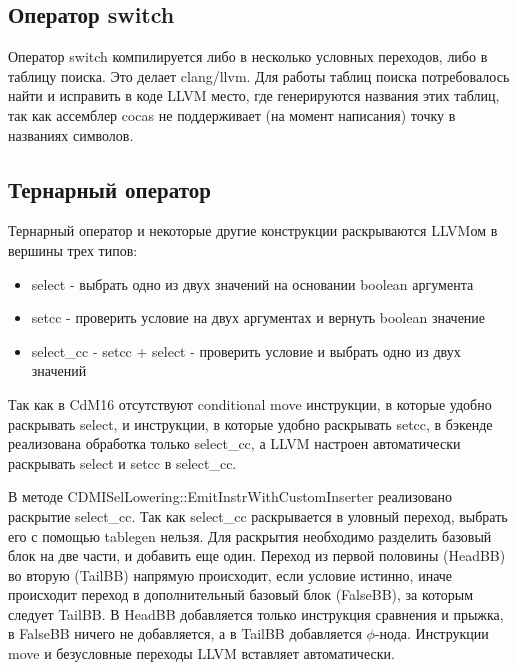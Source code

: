 \documentclass[a4paper,14pt]{extarticle}
\begin{document}
\subsection{Оператор switch}

Оператор switch компилируется либо в несколько условных переходов, либо в таблицу поиска. Это делает clang/llvm. Для работы таблиц поиска потребовалось найти и исправить в коде LLVM место, где генерируются названия этих таблиц, так как ассемблер cocas не поддерживает (на момент написания) точку в названиях символов.

\subsection{Тернарный оператор}

Тернарный оператор и некоторые другие конструкции раскрываются LLVMом в вершины трех типов:
\begin{itemize}
	\item select - выбрать одно из двух значений на основании boolean аргумента
	\item setcc - проверить условие на двух аргументах и вернуть boolean значение
	\item select\_cc - setcc + select - проверить условие и выбрать одно из двух значений
\end{itemize}

Так как в CdM16 отсутствуют conditional move инструкции, в которые удобно раскрывать select, и инструкции, в которые удобно раскрывать setcc, в бэкенде реализована обработка только select\_cc, а LLVM настроен автоматически раскрывать select и setcc в select\_cc. %

В методе CDMISelLowering::EmitInstrWithCustomInserter реализовано раскрытие select\_cc. Так как select\_cc раскрывается в уловный переход, выбрать его с помощью tablegen нельзя. Для раскрытия необходимо разделить базовый блок на две части, и добавить еще один. Переход из первой половины (HeadBB) во вторую (TailBB) напрямую происходит, если условие истинно, иначе происходит переход в дополнительный базовый блок (FalseBB), за которым следует TailBB. В HeadBB добавляется только инструкция сравнения и прыжка, в FalseBB ничего не добавляется, а в TailBB добавляется %
$\phi$-нода. Инструкции move и безусловные переходы LLVM вставляет автоматически.
\end{document}
